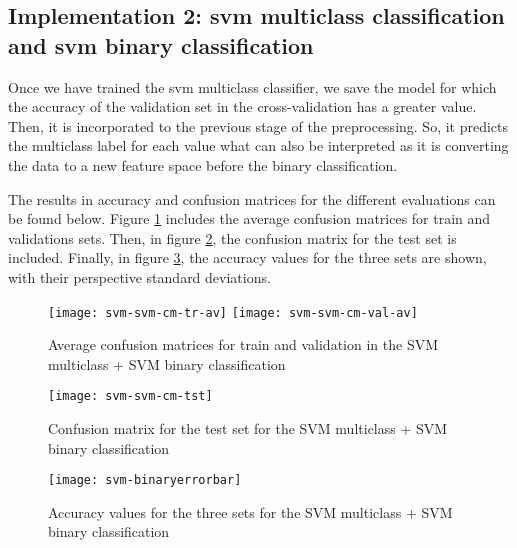 \subsection{Implementation 2: \acrshort{svm} multiclass classification and \acrshort{svm} binary classification}

	Once we have trained the \acrshort{svm} multiclass classifier, we save the model for which the accuracy of the validation set in the cross-validation has a greater value. Then, it is incorporated to the previous stage of the preprocessing. So, it predicts the multiclass label for each value what can also be interpreted as it is converting the data to a new feature space before the binary classification.
	
	The results in accuracy and confusion matrices for the different evaluations can be found below. Figure \ref{fig:mesh23} includes the average confusion matrices for train and validations sets. Then, in figure \ref{fig:mesh24}, the confusion matrix for the test set is included. Finally, in figure \ref{fig:mesh25}, the accuracy values for the three sets are shown, with their perspective standard deviations.
	
	\begin{figure}[t]
		\centering
		\captionsetup{justification=centering}
		\texttt{[image: svm-svm-cm-tr-av]}%
		\texttt{[image: svm-svm-cm-val-av]}	
		\caption{Average confusion matrices for train and validation in the SVM multiclass + SVM binary classification}
		\label{fig:mesh23}
	\end{figure}
	
	\begin{figure}[t]
		\centering
		\captionsetup{justification=centering}
		\texttt{[image: svm-svm-cm-tst]}
		\caption{Confusion matrix for the test set for the SVM multiclass + SVM binary classification}
		\label{fig:mesh24}
	\end{figure}
	
	\begin{figure}[t]
		\centering
		\captionsetup{justification=centering}
		\texttt{[image: svm-binaryerrorbar]}
		\caption{Accuracy values for the three sets for the SVM multiclass + SVM binary classification}
		\label{fig:mesh25}
	\end{figure}

